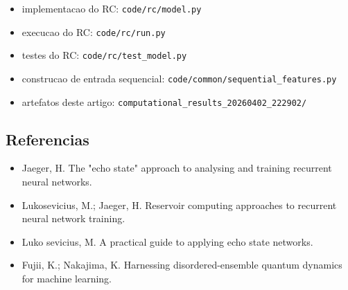 \documentclass[12pt]{article}
\providecommand{\tightlist}{%
          \setlength{\itemsep}{0pt}\setlength{\parskip}{0pt}}
\begin{document}
\begin{itemize}
\tightlist
\item
  implementacao do RC: \texttt{code/rc/model.py}
\item
  execucao do RC: \texttt{code/rc/run.py}
\item
  testes do RC: \texttt{code/rc/test\_model.py}
\item
  construcao de entrada sequencial: \texttt{code/common/sequential\_features.py}
\item
  artefatos deste artigo: \texttt{computational\_results\_20260402\_222902/}
\end{itemize}

\subsection{Referencias}\label{referencias}

\begin{itemize}
\tightlist
\item
  Jaeger, H. The "echo state" approach to analysing and training recurrent neural networks.
\item
  Lukosevicius, M.; Jaeger, H. Reservoir computing approaches to recurrent neural network training.
\item
  Luko sevicius, M. A practical guide to applying echo state networks.
\item
  Fujii, K.; Nakajima, K. Harnessing disordered-ensemble quantum dynamics for machine learning.
\end{itemize}

        
\end{document}
